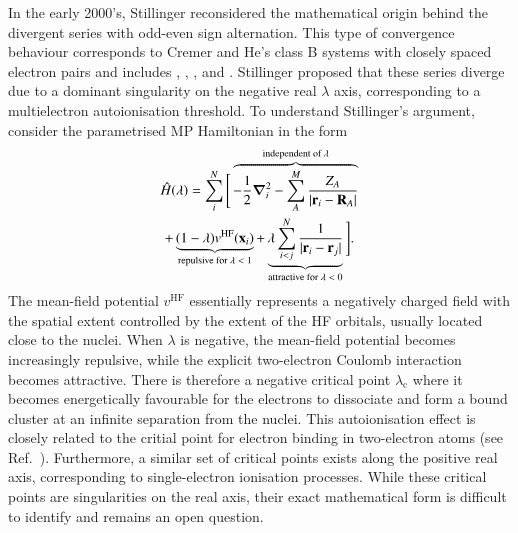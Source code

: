 \documentclass[aps,prb,reprint,noshowkeys,superscriptaddress]{revtex4-1}
\newcommand{\Ne}{N} %
\newcommand{\Nn}{M} %
\newcommand{\hH}{\Hat{H}}
\newcommand{\lc}{\lambda_{\text{c}}}
\begin{document}
In the early 2000's, Stillinger reconsidered the mathematical origin behind the divergent series with odd-even
sign alternation.\cite{Stillinger_2000} 
This type of convergence behaviour corresponds to Cremer and He's class B systems with closely spaced
electron pairs and includes , , , and .\cite{Cremer_1996}
Stillinger proposed that these series diverge due to a dominant singularity
on the negative real $\lambda$ axis, corresponding to a multielectron autoionisation threshold.\cite{Stillinger_2000}
To understand Stillinger's argument, consider the parametrised MP Hamiltonian in the form
\begin{multline}
\label{eq:HamiltonianStillinger}
    \hH(\lambda) = 
    \sum_{i}^{\Ne} \Bigg[ 
    \overbrace{-\frac{1}{2}\grad_i^2 
    - \sum_{A}^{\Nn} \frac{Z_A}{\abs{\vb{r}_i-\vb{R}_A}}}^{\text{independent of $\lambda$}}
    \\
    + \underbrace{(1-\lambda)v^{\text{HF}}(\vb{x}_i)}_{\text{repulsive for $\lambda < 1$}}
    + \underbrace{\lambda\sum_{i<j}^{\Ne}\frac{1}{|\vb{r}_i-\vb{r}_j|}}_{\text{attractive for $\lambda < 0$}}
    \Bigg].
\end{multline}
The mean-field potential $v^{\text{HF}}$ essentially represents a negatively charged field with the spatial extent
controlled by the extent of the HF orbitals, usually located close to the nuclei.
When $\lambda$ is negative, the mean-field potential becomes increasingly repulsive, while the explicit two-electron 
Coulomb interaction becomes attractive.
There is therefore a negative critical point $\lc$ where it becomes energetically favourable for the electrons 
to dissociate and form a bound cluster at an infinite separation from the nuclei.\cite{Stillinger_2000}
This autoionisation effect is closely related to the critial point for electron binding in two-electron 
atoms (see Ref.~).
Furthermore, a similar set of critical points exists along the positive real axis, corresponding to single-electron ionisation
processes.\cite{Sergeev_2005}
While these critical points are singularities on the real axis, their exact mathematical form is difficult 
to identify and remains an open question.
\end{document}
